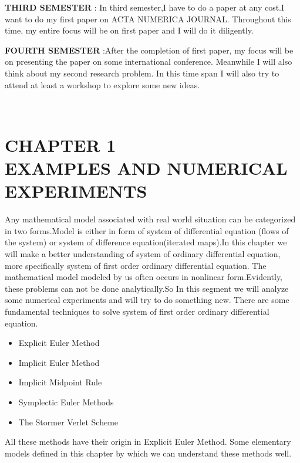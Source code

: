 \documentclass[PhD]{iitmdiss}
\begin{document}
{{\begin{itemize}
{\end{itemize}
\textbf{THIRD SEMESTER} : In third semester,I have to do a paper at any cost.I want to do my first paper on
ACTA NUMERICA JOURNAL. Throughout this time, my entire focus will be on first paper
and I will do it diligently.\\
\par
\textbf{FOURTH SEMESTER} :After the completion of first paper, my focus will be on presenting the paper on some international conference. Meanwhile I will also think about my second research problem. In this time span I will also try to attend at least a workshop to explore some new ideas.}\\

\chapter{CHAPTER 1\\ EXAMPLES AND NUMERICAL EXPERIMENTS}
Any mathematical model associated with real world situation can be categorized in two forms.Model is either in form of system of differential equation (flows of the system) or system of difference equation(iterated maps).In this chapter we will make a better understanding of system of ordinary differential equation, more specifically system of first order ordinary differential equation. The mathematical model modeled by us often occurs in nonlinear form.Evidently, these problems can not be done analytically.So In this segment we will analyze some numerical experiments and will try to do something new.
There are some fundamental techniques to solve system of first order ordinary differential equation.\\
\begin{itemize}
    \item {Explicit Euler Method}\\
    \item {Implicit Euler Method}\\
    \item {Implicit Midpoint Rule}\\
    \item {Symplectic Euler Methods}\\
    \item {The Stormer Verlet Scheme}\\
\end{itemize}
All these methods have their origin in Explicit Euler Method. Some elementary models  defined in this chapter by which we can understand these methods well.
}
\end{document}

